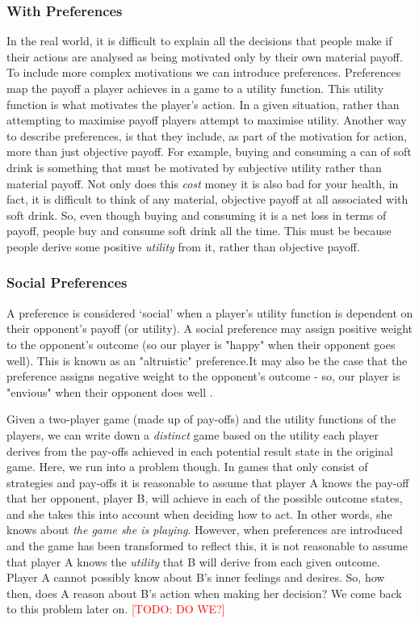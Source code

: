 \documentclass[12pt]{article}
\newcommand{\todo}[1]{\textcolor{red}{[TODO: #1]}\PackageWarning{TODO:}{#1!}}
\newcommand*{\np}{\par\noindent\newline}
\begin{document}
\subsubsection{With Preferences}
In the real world, it is difficult to explain all the decisions that people
make if their actions are analysed as being motivated only by their own
material payoff. To include more complex motivations we can introduce
preferences. Preferences map the payoff a player achieves in a game to a
utility function. This utility function is what motivates the player's action.
In a given situation, rather than attempting to maximise payoff players attempt
to maximise utility. Another way to describe preferences, is that they include,
as part of the motivation for action, more than just objective payoff. For
example, buying and consuming a can of soft drink is something that must be
motivated by subjective utility rather than material payoff. Not only does this
\textit{cost} money it is also bad for your health, in fact, it is difficult to
think of any material, objective payoff at all associated with soft drink. So,
even though buying and consuming it is a net loss in terms of payoff, people
buy and consume soft drink all the time. This must be because people derive
some positive \textit{utility} from it, rather than objective payoff.

\subsubsection{Social Preferences}
A preference is considered `social' when a player's utility function is
dependent on their opponent's payoff (or utility). A social preference may
assign positive weight to the opponent's outcome (so our player is "happy" when
their opponent goes well). This is known as an "altruistic" preference.It may
also be the case that the preference assigns negative weight to the opponent's
outcome - so, our player is "envious" when their opponent does well
\cite{angner_course_2012}.
\np Given a two-player game (made up of pay-offs) and the utility functions of
the players, we can write down a \textit{distinct} game based on the utility
each player derives from the pay-offs achieved in each potential result state
in the original game. Here, we run into a problem though. In games that
only consist of strategies and pay-offs it is reasonable to assume that player
A knows the pay-off that her opponent, player B, will achieve in each of the
possible outcome states, and she takes this into account when deciding how to
act. In other words, she knows about \textit{the game she is playing}. However,
when preferences are introduced and the game has been transformed to reflect
this, it is not reasonable to assume that player A knows the \textit{utility}
that B will derive from each given outcome. Player A cannot possibly know about
B's inner feelings and desires. So, how then, does A reason about B's action
when making her decision? We come back to this problem later on. \todo{DO WE?}
\end{document}
